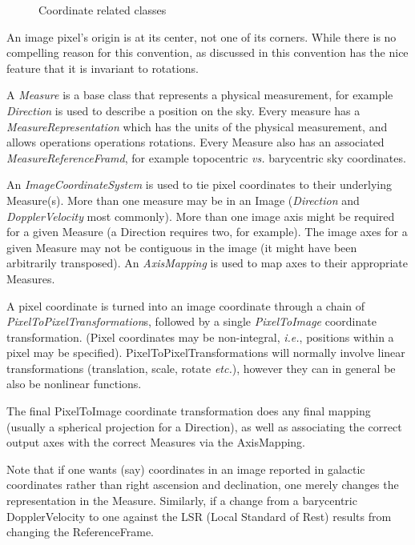 \begin{figure}
\epsfverbosetrue
\epsfxsize=6.0in
\caption{Coordinate related classes}
\label{fig:coords}
\end{figure}

An image pixel's origin is at its center, not one of its
corners. While there is no compelling reason for this convention, as
discussed in \cite{gc:fits} this convention has the nice feature that
it is invariant to rotations.

A {\em Measure} is a base class that represents a physical
measurement, for example {\em Direction} is used to describe a
position on the sky. Every measure has a {\em MeasureRepresentation}
which has the units of the physical measurement, and allows operations
operations rotations. Every Measure also has an associated{\em
MeasureReferenceFramd}, for example topocentric {\em vs.} barycentric
sky coordinates.

An {\em ImageCoordinateSystem} is used to tie pixel coordinates to
their underlying Measure(s). More than one measure may be in an Image
({\em Direction} and {\em DopplerVelocity} most commonly). More than
one image axis might be required for a given Measure (a Direction
requires two, for example). The image axes for a given Measure may not
be contiguous in the image (it might have been arbitrarily
transposed). An {\em AxisMapping} is used to map axes to their
appropriate Measures.

A pixel coordinate is turned into an image coordinate through a chain
of {\em PixelToPixelTransformation}s, followed by a single {\em
PixelToImage} coordinate transformation. (Pixel coordinates may be
non-integral, {\em i.e.}, positions within a pixel may be
specified). PixelToPixelTransformations will normally involve linear
transformations (translation, scale, rotate {\em etc.}), however they
can in general be also be nonlinear functions.

The final PixelToImage coordinate transformation does any final
mapping (usually a spherical projection for a Direction), as well as
associating the correct output axes with the correct Measures via the
AxisMapping.

Note that if one wants (say) coordinates in an image reported in
galactic coordinates rather than right ascension and declination, one
merely changes the representation in the Measure. Similarly, if a
change from a barycentric DopplerVelocity to one against the LSR
(Local Standard of Rest) results from changing the ReferenceFrame.

